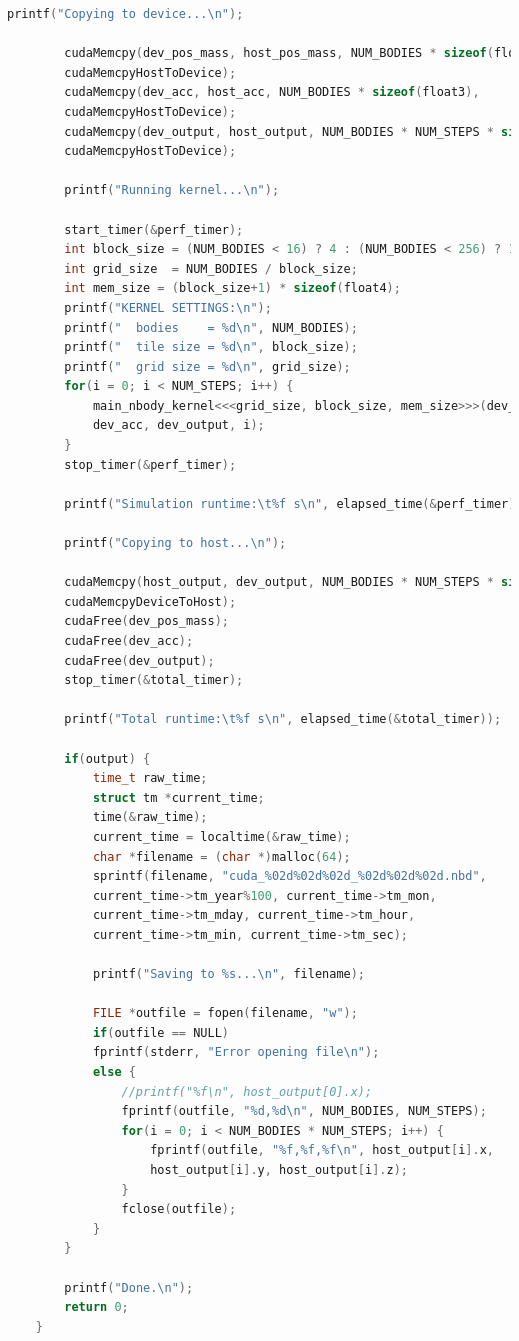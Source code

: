 \documentclass[10pt,a4paper]{article}
\begin{document}
\begin{lstlisting}[language=c]
		printf("Copying to device...\n");
		
		cudaMemcpy(dev_pos_mass, host_pos_mass, NUM_BODIES * sizeof(float3),
		cudaMemcpyHostToDevice);
		cudaMemcpy(dev_acc, host_acc, NUM_BODIES * sizeof(float3),
		cudaMemcpyHostToDevice);
		cudaMemcpy(dev_output, host_output, NUM_BODIES * NUM_STEPS * sizeof(float3),
		cudaMemcpyHostToDevice);
		
		printf("Running kernel...\n");
		
		start_timer(&perf_timer);
		int block_size = (NUM_BODIES < 16) ? 4 : (NUM_BODIES < 256) ? 16 : 32;
		int grid_size  = NUM_BODIES / block_size;
		int mem_size = (block_size+1) * sizeof(float4);
		printf("KERNEL SETTINGS:\n");
		printf("  bodies    = %d\n", NUM_BODIES);
		printf("  tile size = %d\n", block_size);
		printf("  grid size = %d\n", grid_size);
		for(i = 0; i < NUM_STEPS; i++) {
			main_nbody_kernel<<<grid_size, block_size, mem_size>>>(dev_pos_mass,
			dev_acc, dev_output, i);
		}
		stop_timer(&perf_timer);
		
		printf("Simulation runtime:\t%f s\n", elapsed_time(&perf_timer));
		
		printf("Copying to host...\n");
		
		cudaMemcpy(host_output, dev_output, NUM_BODIES * NUM_STEPS * sizeof(float3),
		cudaMemcpyDeviceToHost);
		cudaFree(dev_pos_mass);
		cudaFree(dev_acc);
		cudaFree(dev_output);
		stop_timer(&total_timer);
		
		printf("Total runtime:\t%f s\n", elapsed_time(&total_timer));
		
		if(output) {
			time_t raw_time;
			struct tm *current_time;
			time(&raw_time);
			current_time = localtime(&raw_time);
			char *filename = (char *)malloc(64);
			sprintf(filename, "cuda_%02d%02d%02d_%02d%02d%02d.nbd", 
			current_time->tm_year%100, current_time->tm_mon,
			current_time->tm_mday, current_time->tm_hour,
			current_time->tm_min, current_time->tm_sec);
			
			printf("Saving to %s...\n", filename);
			
			FILE *outfile = fopen(filename, "w");
			if(outfile == NULL)
			fprintf(stderr, "Error opening file\n");
			else {
				//printf("%f\n", host_output[0].x);
				fprintf(outfile, "%d,%d\n", NUM_BODIES, NUM_STEPS);
				for(i = 0; i < NUM_BODIES * NUM_STEPS; i++) {
					fprintf(outfile, "%f,%f,%f\n", host_output[i].x, 
					host_output[i].y, host_output[i].z);
				}
				fclose(outfile);
			}
		}
		
		printf("Done.\n");
		return 0;
	}
	

\end{lstlisting}
\end{document}
